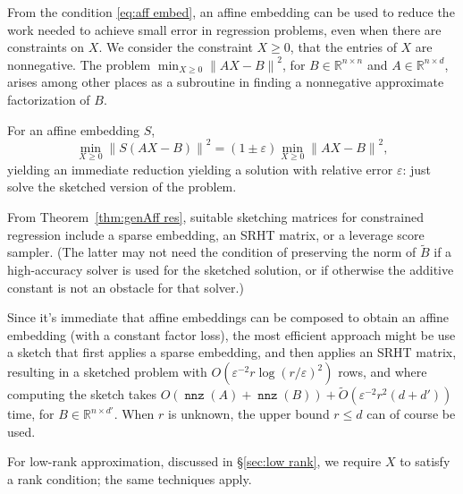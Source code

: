 \documentclass{sig-alternate}
\newcommand{\norm}[1]{{\| #1 \|}}
\DeclareMathOperator{\nnz}{\mathtt{nnz}}
\DeclareMathOperator{\argmin}{\mathrm{argmin}}
\newcommand\tO{\tilde{O}}
\newcommand{\eps}{\varepsilon}
\newcommand{\R}{{\mathbb R}}
\begin{document}
From the condition \eqref{eq:aff embed}, an affine embedding
can be used to reduce the work needed to achieve small
error in regression problems, even when there are constraints
on $X$. We consider the constraint $X\ge 0$, that the entries
of $X$ are nonnegative. The problem
$\min_{X\ge 0} \norm{AX - B}^2$,
for $B\in\R^{n\times n}$ and $A\in \R^{n\times d}$,
arises among other places as a subroutine in finding
a nonnegative approximate factorization of $B$.

For an affine embedding $S$,
\[
\min_{X\ge 0} \norm{S(AX - B)}^2
	= (1\pm \eps)\min_{X\ge 0} \norm{AX - B}^2,
\]
yielding an immediate reduction yielding a solution with relative
error $\eps$: just solve the sketched version of the problem.

From Theorem~\ref{thm:genAff res}, suitable
sketching matrices for constrained regression
include a sparse embedding, 
an SRHT matrix, or a leverage
score sampler. (The latter may not need the condition
of preserving the norm of $\tilde B$ if a high-accuracy
solver is used for the sketched solution, or if otherwise
the additive constant is not an obstacle for that solver.)

Since it's immediate that affine embeddings can be composed
to obtain an affine embedding (with a constant factor loss),
the most efficient approach might be use a sketch
that first applies a sparse embedding, and then
applies an SRHT matrix, resulting
in a sketched problem with $O(\eps^{-2}r\log(r/\eps)^2)$ rows,
and where computing the
sketch takes $O(\nnz(A) + \nnz(B)) + \tO(\eps^{-2}r^2 (d+d'))$ time,
for $B\in \R^{n\times d'}$. When $r$ is unknown, the upper
bound $r\le d$ can of course be used.

For low-rank approximation, discussed in \S\ref{sec:low rank},
we require $X$ to satisfy a rank condition; the same techniques apply.


\iffalse
Another way to apply our techniques, which is more expensive
but yields higher quality answers, is as follows:
first factor $A$ as $A=QW$, with
$Q$ having orthormal columns and $W\in\R^{r\times r}$ upper triangular.
From Fact~\ref{fact:normal}, the normal equations,
\[
\norm{QWX - B}^2
	= \norm{QWX - QY^*}^2 + \norm{QY^* - B}^2
	= \norm{WX - Q^\top B}^2 + \norm{QQ^\top B - B}^2
\]
where $Y^*=Q^\top B = \argmin_Y \norm{QY-B}^2$,
using here the fact that $Q$ has orthonormal columns.

Thus after solving a generalized regression problem,
it remains to solve $\min_{X\ge 0} \norm{WX-Q^\top B}^2$,
that is, to find for each column of $Q^\top B$ the
nearest vector in the cone generated by the columns of~$W$.
For the given column, this problem can be solved in $r^4$ time,
so that the cost for all columns is $O(r^4 d')$. 
\fi
\end{document}
